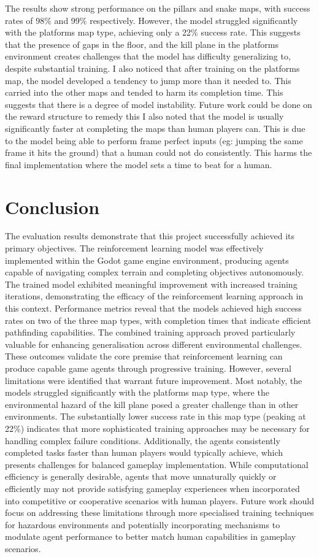 The results show strong performance on the pillars and snake maps, with success rates of 98\% and 99\% respectively. However, the model struggled significantly with the platforms map type, achieving only a 22\% success rate. 
This suggests that the presence of gaps in the floor, and the kill plane in the platforms environment creates challenges that the model has difficulty generalizing to, despite substantial training.
I also noticed that after training on the platforms map, the model developed a tendency to jump more than it needed to. This carried into the other maps and tended to harm its completion time.
This suggests that there is a degree of model instability. Future work could be done on the reward structure to remedy this
I also noted that the model is usually significantly faster at completing the maps than human players can. This is due to the model being able to perform frame perfect inputs (eg: jumping the same frame it hits the ground) 
that a human could not do consistently. This harms the final implementation where the model sets a time to beat for a human.

\section{Conclusion}

The evaluation results demonstrate that this project successfully achieved its primary objectives. 
The reinforcement learning model was effectively implemented within the Godot game engine environment, producing agents capable of navigating complex terrain and completing objectives autonomously. 
The trained model exhibited meaningful improvement with increased training iterations, demonstrating the efficacy of the reinforcement learning approach in this context.
Performance metrics reveal that the models achieved high success rates on two of the three map types, with completion times that indicate efficient pathfinding capabilities. 
The combined training approach proved particularly valuable for enhancing generalisation across different environmental challenges. 
These outcomes validate the core premise that reinforcement learning can produce capable game agents through progressive training.
However, several limitations were identified that warrant future improvement. 
Most notably, the models struggled significantly with the platforms map type, where the environmental hazard of the kill plane posed a greater challenge than in other environments. 
The substantially lower success rate in this map type (peaking at 22\%) indicates that more sophisticated training approaches may be necessary for handling complex failure conditions.
Additionally, the agents consistently completed tasks faster than human players would typically achieve, which presents challenges for balanced gameplay implementation. 
While computational efficiency is generally desirable, agents that move unnaturally quickly or efficiently may not provide satisfying gameplay experiences when incorporated into competitive or cooperative scenarios with human players.
Future work should focus on addressing these limitations through more specialised training techniques for hazardous environments and potentially incorporating mechanisms to modulate agent performance to better match human capabilities in gameplay scenarios.